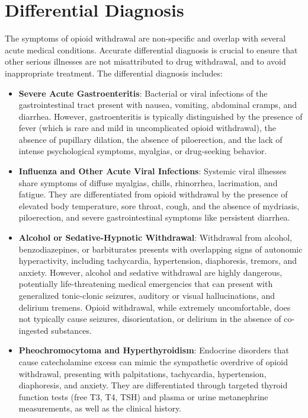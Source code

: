 \section*{Differential Diagnosis}
The symptoms of opioid withdrawal are non-specific and overlap with several acute medical conditions. Accurate differential diagnosis is crucial to ensure that other serious illnesses are not misattributed to drug withdrawal, and to avoid inappropriate treatment. The differential diagnosis includes:
\begin{itemize}
    \item \textbf{Severe Acute Gastroenteritis}: Bacterial or viral infections of the gastrointestinal tract present with nausea, vomiting, abdominal cramps, and diarrhea. However, gastroenteritis is typically distinguished by the presence of fever (which is rare and mild in uncomplicated opioid withdrawal), the absence of pupillary dilation, the absence of piloerection, and the lack of intense psychological symptoms, myalgias, or drug-seeking behavior.
    \item \textbf{Influenza and Other Acute Viral Infections}: Systemic viral illnesses share symptoms of diffuse myalgias, chills, rhinorrhea, lacrimation, and fatigue. They are differentiated from opioid withdrawal by the presence of elevated body temperature, sore throat, cough, and the absence of mydriasis, piloerection, and severe gastrointestinal symptoms like persistent diarrhea.
    \item \textbf{Alcohol or Sedative-Hypnotic Withdrawal}: Withdrawal from alcohol, benzodiazepines, or barbiturates presents with overlapping signs of autonomic hyperactivity, including tachycardia, hypertension, diaphoresis, tremors, and anxiety. However, alcohol and sedative withdrawal are highly dangerous, potentially life-threatening medical emergencies that can present with generalized tonic-clonic seizures, auditory or visual hallucinations, and delirium tremens. Opioid withdrawal, while extremely uncomfortable, does not typically cause seizures, disorientation, or delirium in the absence of co-ingested substances.
    \item \textbf{Pheochromocytoma and Hyperthyroidism}: Endocrine disorders that cause catecholamine excess can mimic the sympathetic overdrive of opioid withdrawal, presenting with palpitations, tachycardia, hypertension, diaphoresis, and anxiety. They are differentiated through targeted thyroid function tests (free T3, T4, TSH) and plasma or urine metanephrine measurements, as well as the clinical history.

\end{itemize}
